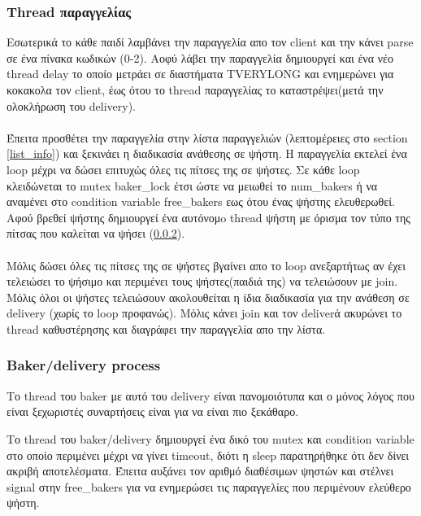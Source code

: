 \documentclass{article}
\begin{document}
\subsubsection{Thread παραγγελίας}
\label{order}
Εσωτερικά το κάθε παιδί λαμβάνει την παραγγελία απο τον client και την κάνει parse σε ένα πίνακα κωδικών (0-2).
Αοφύ λάβει την παραγγελία δημιουργεί και ένα νέο thread delay το οποίο μετράει σε διαστήματα TVERYLONG και ενημερώνει για κοκακολα τον client, έως ότου το thread παραγγελίας το καταστρέψει(μετά την ολοκλήρωση του delivery).
\paragraph{}
Έπειτα προσθέτει την παραγγελία στην λίστα παραγγελιών (λεπτομέρειες στο section \ref{list_info}) και ξεκινάει η διαδικασία ανάθεσης σε ψήστη. H παραγγελία εκτελεί ένα loop μέχρι να δώσει επιτυχώς όλες τις πίτσες της σε ψήστες. Σε κάθε loop κλειδώνεται το mutex baker\_lock έτσι ώστε να μειωθεί το num\_bakers ή να αναμένει στο condition variable free\_bakers εως ότου ένας ψήστης ελευθερωθεί. Αφού βρεθεί ψήστης δημιουργεί ένα αυτόνομo thread ψήστη με όρισμα τον τύπο της πίτσας που καλείται να ψήσει
(\ref{baker}). 
\paragraph{}
Μόλις δώσει όλες τις πίτσες της σε ψήστες βγαίνει απο το loop ανεξαρτήτως αν έχει τελειώσει το ψήσιμο και περιμένει τους ψήστες(παιδιά της) να τελειώσουν με join. Μόλις όλοι οι ψήστες τελειώσουν ακολουθείται η ίδια διαδικασία για την ανάθεση σε delivery (χωρίς το loop προφανώς).
Μόλις κάνει join και τον deliverά ακυρώνει το thread καθυστέρησης και διαγράφει την παραγγελία απο την λίστα.

\subsubsection{Baker/delivery process}
\label{baker}
Το thread του baker με αυτό του delivery είναι πανομοιότυπα 
και ο μόνος λόγος που είναι ξεχωριστές συναρτήσεις είναι για να είναι πιο ξεκάθαρο.
  
Το thread του baker/delivery δημιουργεί ένα δικό του mutex και condition variable στο οποίο περιμένει μέχρι να γίνει timeout, διότι η sleep παρατηρήθηκε ότι δεν δίνει ακριβή αποτελέσματα. Έπειτα αυξάνει τον αριθμό διαθέσιμων ψηστών και στέλνει signal στην free\_bakers για να ενημερώσει τις παραγγελίες που περιμένουν ελεύθερο ψήστη.
\end{document}
